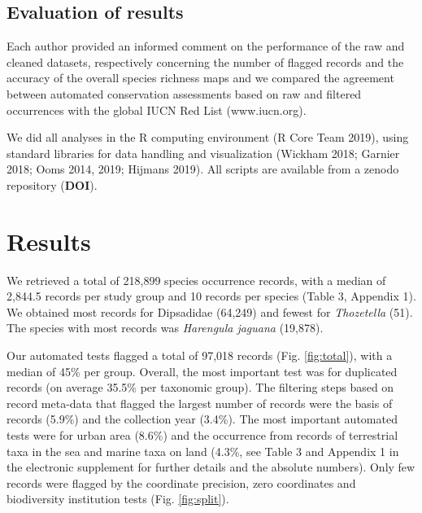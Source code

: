 \documentclass[fleqn,10pt,lineno]{wlpeerj} %
\begin{document}
\hypertarget{evaluation-of-results}{%
\subsection*{Evaluation of results}\label{evaluation-of-results}}

Each author provided an informed comment on the performance of the raw and cleaned datasets, respectively concerning the number of flagged records and the accuracy of the overall species richness maps and we compared the agreement between automated conservation assessments based on raw and filtered occurrences with the global IUCN Red List (www.iucn.org).

We did all analyses in the R computing environment (R Core Team 2019), using standard libraries for data handling and visualization (Wickham 2018; Garnier 2018; Ooms 2014, 2019; Hijmans 2019). All scripts are available from a zenodo repository (\textbf{DOI}).

\hypertarget{results}{%
\section*{Results}\label{results}}

We retrieved a total of 218,899 species occurrence records, with a median of 2,844.5 records per study group and 10 records per species (Table 3, Appendix 1). We obtained most records for Dipsadidae (64,249) and fewest for \emph{Thozetella} (51). The species with most records was \emph{Harengula jaguana} (19,878).

Our automated tests flagged a total of 97,018 records (Fig. \ref{fig:total}), with a median of 45\% per group. Overall, the most important test was for duplicated records (on average 35.5\% per taxonomic group). The filtering steps based on record meta-data that flagged the largest number of records were the basis of records (5.9\%) and the collection year (3.4\%). The most important automated tests were for urban area (8.6\%) and the occurrence from records of terrestrial taxa in the sea and marine taxa on land (4.3\%, see Table 3 and Appendix 1 in the electronic supplement for further details and the absolute numbers). Only few records were flagged by the coordinate precision, zero coordinates and biodiversity institution tests (Fig. \ref{fig:split}).
\end{document}
